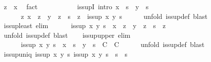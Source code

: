 \begin{isabellebody}
\ {\isachardoublequoteopen}z\ {\isasymsqsubseteq}\ x{\isachardoublequoteclose}\ \isamarkupfalse%
\ fact\isanewline
\ \ \ \ \isamarkupfalse%
\isanewline
\ \ \isamarkupfalse%
\isanewline
\isanewline
\ \ \isamarkupfalse%
\ is{\isacharunderscore}supI\ {\isacharbrackleft}intro{\isacharquery}{\isacharbrackright}{\isacharcolon}\ {\isachardoublequoteopen}x\ {\isasymsqsubseteq}\ s\ {\isasymLongrightarrow}\ y\ {\isasymsqsubseteq}\ s\ {\isasymLongrightarrow}\isanewline
\ \ \ \ \ \ {\isacharparenleft}{\isasymAnd}z{\isachardot}\ x\ {\isasymsqsubseteq}\ z\ {\isasymLongrightarrow}\ y\ {\isasymsqsubseteq}\ z\ {\isasymLongrightarrow}\ s\ {\isasymsqsubseteq}\ z{\isacharparenright}\ {\isasymLongrightarrow}\ is{\isacharunderscore}sup\ x\ y\ s{\isachardoublequoteclose}\isanewline
\ \ \ \ \isamarkupfalse%
\ {\isacharparenleft}unfold\ is{\isacharunderscore}sup{\isacharunderscore}def{\isacharparenright}\ blast\isanewline
\isanewline
\ \ \isamarkupfalse%
\ is{\isacharunderscore}sup{\isacharunderscore}least\ {\isacharbrackleft}elim{\isacharquery}{\isacharbrackright}{\isacharcolon}\isanewline
\ \ \ \ \ \ {\isachardoublequoteopen}is{\isacharunderscore}sup\ x\ y\ s\ {\isasymLongrightarrow}\ x\ {\isasymsqsubseteq}\ z\ {\isasymLongrightarrow}\ y\ {\isasymsqsubseteq}\ z\ {\isasymLongrightarrow}\ s\ {\isasymsqsubseteq}\ z{\isachardoublequoteclose}\isanewline
\ \ \ \ \isamarkupfalse%
\ {\isacharparenleft}unfold\ is{\isacharunderscore}sup{\isacharunderscore}def{\isacharparenright}\ blast\isanewline
\isanewline
\ \ \isamarkupfalse%
\ is{\isacharunderscore}sup{\isacharunderscore}upper\ {\isacharbrackleft}elim{\isacharquery}{\isacharbrackright}{\isacharcolon}\isanewline
\ \ \ \ \ \ {\isachardoublequoteopen}is{\isacharunderscore}sup\ x\ y\ s\ {\isasymLongrightarrow}\ {\isacharparenleft}x\ {\isasymsqsubseteq}\ s\ {\isasymLongrightarrow}\ y\ {\isasymsqsubseteq}\ s\ {\isasymLongrightarrow}\ C{\isacharparenright}\ {\isasymLongrightarrow}\ C{\isachardoublequoteclose}\isanewline
\ \ \ \ \isamarkupfalse%
\ {\isacharparenleft}unfold\ is{\isacharunderscore}sup{\isacharunderscore}def{\isacharparenright}\ blast%
\endisataginvisible
{\isafoldinvisible}%
%
\isadeliminvisible
\isanewline
%
\endisadeliminvisible
\isanewline
\ \ \isamarkupfalse%
\ is{\isacharunderscore}sup{\isacharunderscore}uniq{\isacharcolon}\ {\isachardoublequoteopen}{\isasymlbrakk}is{\isacharunderscore}sup\ x\ y\ s{\isacharsemicolon}\ is{\isacharunderscore}sup\ x\ y\ s{\isacharprime}{\isasymrbrakk}\ {\isasymLongrightarrow}\ s\ {\isacharequal}\ s{\isacharprime}{\isachardoublequoteclose}\isanewline

\end{isabellebody}
